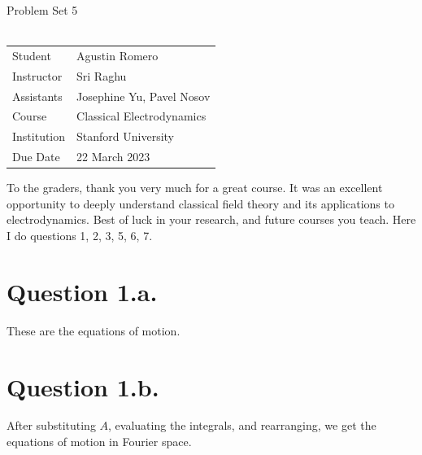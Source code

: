 \documentclass{article}
\begin{document}
\begin{center}
{\Large{Problem Set 5}}\\~\\
\begin{tabular}{l l}
Student&Agustin Romero\\
Instructor&Sri Raghu\\
Assistants&Josephine Yu, Pavel Nosov\\
Course&Classical Electrodynamics\\    
Institution&Stanford University\\
Due Date&22 March 2023\\
\end{tabular}
\end{center}
To the graders, thank you very much for a great course. It was an excellent opportunity to deeply understand classical field theory and its applications to electrodynamics. Best of luck in your research, and future courses you teach. Here I do questions 1, 2, 3, 5, 6, 7.
\section*{Question 1.a.}
\e{\ppa \scl = \p_\mu (\pppa \scl)}
These are the equations of motion.
\section*{Question 1.b.}
After substituting $A$, evaluating the integrals, and rearranging, we get the equations of motion in Fourier space.
\end{document}
